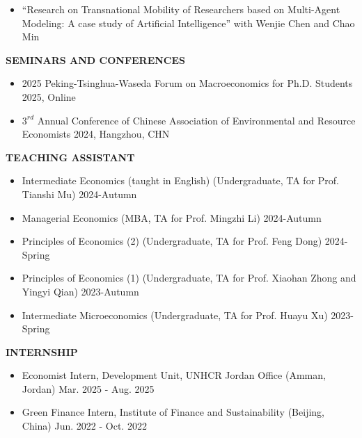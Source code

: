 \documentclass[UTF8]{ctexbook}
\begin{document}
\begin{itemize}
    \item ``Research on Transnational Mobility of Researchers based on Multi-Agent Modeling: A case study of Artificial Intelligence'' with Wenjie Chen and Chao Min
\end{itemize}

\vspace{12pt}

\begin{center}
    \textbf{SEMINARS AND CONFERENCES}
\end{center}

\begin{itemize}
    \item 2025 Peking-Tsinghua-Waseda Forum on Macroeconomics for Ph.D. Students \hfill 2025, Online
    \item $3^{rd}$ Annual Conference of Chinese Association of Environmental and Resource Economists \hfill 2024, Hangzhou, CHN

\end{itemize}


\vspace{12pt}

\begin{center}
    \textbf{TEACHING ASSISTANT}
\end{center}


\begin{itemize}
    \item Intermediate Economics (taught in English) (Undergraduate, TA for Prof. Tianshi Mu) \hfill 2024-Autumn
    \item Managerial Economics (MBA, TA for Prof. Mingzhi Li) \hfill 2024-Autumn
    \item Principles of Economics (2) (Undergraduate, TA for Prof. Feng Dong) \hfill 2024-Spring
    \item Principles of Economics (1) (Undergraduate, TA for Prof. Xiaohan Zhong and Yingyi Qian) \hfill 2023-Autumn
    \item Intermediate Microeconomics (Undergraduate, TA for Prof. Huayu Xu) \hfill 2023-Spring
\end{itemize}

\vspace{12pt}

\begin{center}
    \textbf{INTERNSHIP}
\end{center}

\begin{itemize}
    \item Economist Intern, Development Unit, UNHCR Jordan Office (Amman, Jordan) \hfill Mar. 2025 - Aug. 2025
    \item Green Finance Intern, Institute of Finance and Sustainability (Beijing, China) \hfill Jun. 2022 - Oct. 2022
\end{itemize}
\end{document}
